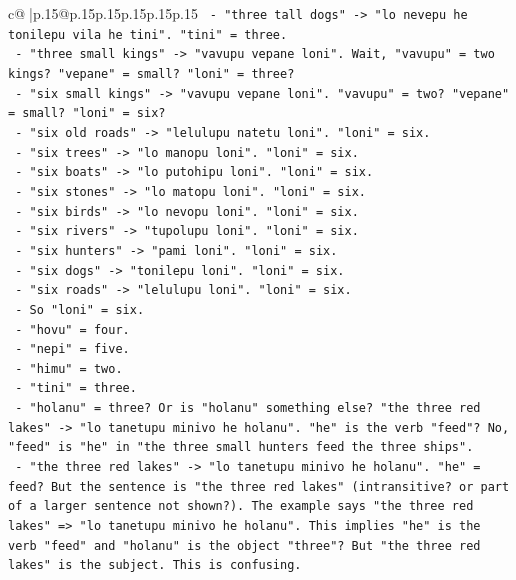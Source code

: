 \documentclass{article}
\begin{document}
{\begin{supertabular}{c@{$\;$}|p{.15\linewidth}@{}p{.15\linewidth}p{.15\linewidth}p{.15\linewidth}p{.15\linewidth}p{.15\linewidth}}
{{{\texttt{          {-} "three tall dogs" {-}> "lo nevepu he tonilepu vila he tini". "tini" = three.} \\
\texttt{          {-} "three small kings" {-}> "vavupu vepane loni". Wait, "vavupu" = two kings? "vepane" = small? "loni" = three?} \\
\texttt{          {-} "six small kings" {-}> "vavupu vepane loni". "vavupu" = two? "vepane" = small? "loni" = six?} \\
\texttt{          {-} "six old roads" {-}> "lelulupu natetu loni". "loni" = six.} \\
\texttt{          {-} "six trees" {-}> "lo manopu loni". "loni" = six.} \\
\texttt{          {-} "six boats" {-}> "lo putohipu loni". "loni" = six.} \\
\texttt{          {-} "six stones" {-}> "lo matopu loni". "loni" = six.} \\
\texttt{          {-} "six birds" {-}> "lo nevopu loni". "loni" = six.} \\
\texttt{          {-} "six rivers" {-}> "tupolupu loni". "loni" = six.} \\
\texttt{          {-} "six hunters" {-}> "pami loni". "loni" = six.} \\
\texttt{          {-} "six dogs" {-}> "tonilepu loni". "loni" = six.} \\
\texttt{          {-} "six roads" {-}> "lelulupu loni". "loni" = six.} \\
\texttt{          {-} So "loni" = six.} \\
\texttt{          {-} "hovu" = four.} \\
\texttt{          {-} "nepi" = five.} \\
\texttt{          {-} "himu" = two.} \\
\texttt{          {-} "tini" = three.} \\
\texttt{          {-} "holanu" = three? Or is "holanu" something else? "the three red lakes" {-}> "lo tanetupu minivo he holanu". "he" is the verb "feed"? No, "feed" is "he" in "the three small hunters feed the three ships".} \\
\texttt{          {-} "the three red lakes" {-}> "lo tanetupu minivo he holanu". "he" = feed? But the sentence is "the three red lakes" (intransitive? or part of a larger sentence not shown?). The example says "the three red lakes" => "lo tanetupu minivo he holanu". This implies "he" is the verb "feed" and "holanu" is the object "three"? But "the three red lakes" is the subject. This is confusing.} \\
}}}
\end{supertabular}}
\end{document}
